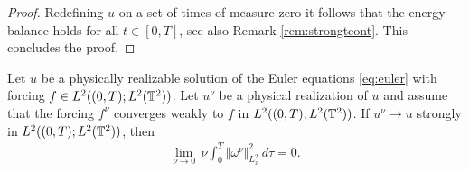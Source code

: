 \documentclass[reqno,12pt]{amsart}
\begin{document}
\begin{proof}
Redefining $u$ on a set of times of measure zero it follows that the energy balance holds for all $t \in [0,T]$, see also Remark \ref{rem:strongtcont}. This concludes the proof.
\end{proof}

\begin{corollary}
\label{cor:vanishing-enstrophy}
Let $u$ be a physically realizable solution of the Euler equations \eqref{eq:euler} with forcing $f \in L^2((0,T);L^2(\mathbb{T}^2))$. Let $u^\nu$ be a physical realization of $u$ and assume that the forcing $f^\nu$ converges weakly to $f$ in $L^2((0,T);L^2(\mathbb{T}^2))$. If $u^\nu \to u$ strongly in $L^2((0,T);L^2(\mathbb{T}^2))$, then
\begin{align}
\label{eq:vanishing-enstrophy}
\lim_{\nu \to 0} \, \nu \int_0^T \Vert \omega^\nu \Vert^2_{L^2_x} \, d\tau = 0.
\end{align}
\end{corollary}
\end{document}
